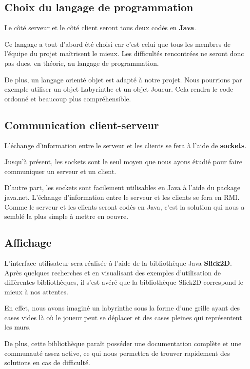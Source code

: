     \subsection{Choix du langage de programmation}
        Le côté serveur et le côté client seront tous deux codés en \textbf{Java}.

        Ce langage a tout d'abord été choisi car c'est celui que tous les membres de l'équipe du projet maîtrisent le mieux. Les difficultés rencontrées ne seront donc pas dues, en théorie, au langage de programmation.

        De plus, un langage orienté objet est adapté à notre projet. Nous pourrions par exemple utiliser un objet Labyrinthe et un objet Joueur. Cela rendra le code ordonné et beaucoup plus compréhensible.

    \subsection{Communication client-serveur}
        \color{red}
        L'échange d'information entre le serveur et les clients se fera à l'aide de \textbf{sockets}.

        Jusqu'à présent, les sockets sont le seul moyen que nous ayons étudié pour faire communiquer un serveur et un client.

        D'autre part, les sockets sont facilement utilisables en Java à l'aide du package java.net.
        \color{green}
        L'échange d'information entre le serveur et les clients se fera en RMI. Comme le serveur et les clients seront codés en Java, c'est la solution qui nous a semblé la plus simple à mettre en oeuvre.
        \color{black}
    \subsection{Affichage}
        L'interface utilisateur sera réalisée à l'aide de la bibliothèque Java \textbf{Slick2D}. Après quelques recherches et en visualisant des exemples d'utilisation de différentes bibliothèques, il s'est avéré que la bibliothèque Slick2D correspond le mieux à nos attentes.

        En effet, nous avons imaginé un labyrinthe sous la forme d'une grille ayant des cases vides là où le joueur peut se déplacer et des cases pleines qui représentent les murs.

        De plus, cette bibliothèque paraît posséder une documentation complète et une communauté assez active, ce qui nous permettra de trouver rapidement des solutions en cas de difficulté.
